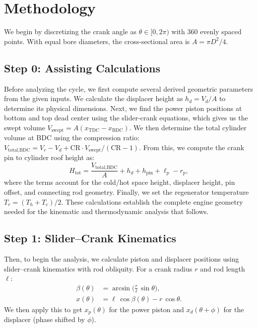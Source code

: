 \documentclass[12pt]{article}
\begin{document}
\section{Methodology}
We begin by discretizing the crank angle as \(\theta \in [0,2\pi)\) with 360 evenly spaced points. With equal bore diameters, the cross-sectional area is \(A = \pi D^{2}/4\).

\subsection{Step 0: Assisting Calculations}
Before analyzing the cycle, we first compute several derived geometric parameters from the given inputs. We calculate the displacer height as \(h_d = V_d/A\) to determine its physical dimensions. Next, we find the power piston positions at bottom and top dead center using the slider-crank equations, which gives us the swept volume \(V_{\text{swept}} = A(x_{\text{TDC}} - x_{\text{BDC}})\). We then determine the total cylinder volume at BDC using the compression ratio: \(V_{\text{total,BDC}} = V_r - V_d + \mathrm{CR} \cdot V_{\text{swept}}/(\mathrm{CR}-1)\). From this, we compute the crank pin to cylinder roof height as:
\begin{equation}
  H_{\text{tot}} = \frac{V_{\text{total,BDC}}}{A} + h_d + h_{\text{pin}} + \ell_p - r_p,
\end{equation}
where the terms account for the cold/hot space height, displacer height, pin offset, and connecting rod geometry. Finally, we set the regenerator temperature \(T_r = (T_h + T_c)/2\). These calculations establish the complete engine geometry needed for the kinematic and thermodynamic analysis that follows.

\subsection{Step 1: Slider--Crank Kinematics}
Then, to begin the analysis, we calculate piston and displacer positions using slider--crank kinematics with rod obliquity. For a crank radius \(r\) and rod length \(\ell\):
\begin{align}
  \beta(\theta) &= \arcsin\!\biggl( \frac{r}{\ell}\,\sin\theta \biggr),\label{eq:beta-def}\\
  x(\theta) &= \ell\,\cos\beta(\theta) - r\,\cos\theta.
\end{align}
We then apply this to get \(x_{p}(\theta)\) for the power piston and \(x_{d}(\theta+\phi)\) for the displacer (phase shifted by \(\phi\)).
\end{document}
